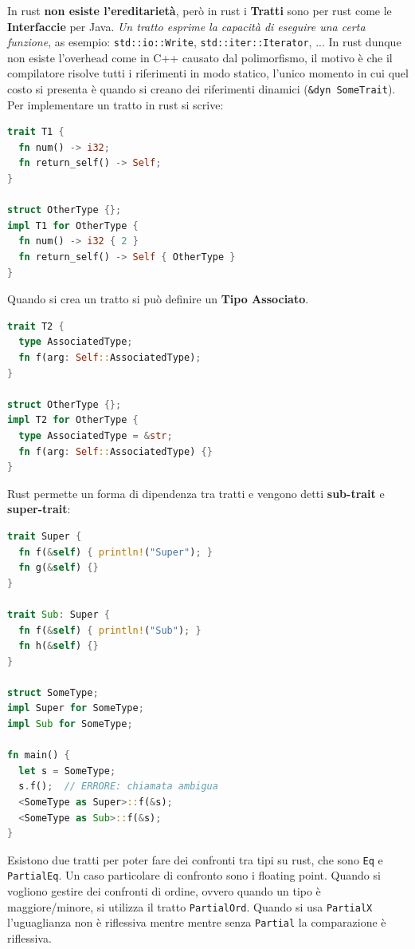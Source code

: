 \documentclass[12pt]{article}
\begin{document}
\hfill

In rust \textbf{non esiste l'ereditariet\`a}, per\`o in rust i \textbf{Tratti} sono per rust come le \textbf{Interfaccie} per Java. \emph{Un tratto esprime la capacit\`a di eseguire una certa funzione}, as esempio: \texttt{std::io::Write}, \texttt{std::iter::Iterator}, ... In rust dunque non esiste l'overhead come in C++ causato dal polimorfismo, il motivo \`e che il compilatore risolve tutti i riferimenti in modo statico, l'unico momento in cui quel costo si presenta \`e quando si creano dei riferimenti dinamici (\texttt{\&dyn SomeTrait}). Per implementare un tratto in rust si scrive:
\begin{lstlisting}[language=rust]
trait T1 {
  fn num() -> i32;
  fn return_self() -> Self;
}

struct OtherType {};
impl T1 for OtherType {
  fn num() -> i32 { 2 }
  fn return_self() -> Self { OtherType }
}
\end{lstlisting}
Quando si crea un tratto si pu\`o definire un \textbf{Tipo Associato}.
\begin{lstlisting}[language=rust]
trait T2 {
  type AssociatedType;
  fn f(arg: Self::AssociatedType);
}

struct OtherType {};
impl T2 for OtherType {
  type AssociatedType = &str;
  fn f(arg: Self::AssociatedType) {}
}
\end{lstlisting}
Rust permette un forma di dipendenza tra tratti e vengono detti \textbf{sub-trait} e \textbf{super-trait}:
\begin{lstlisting}[language=rust]
trait Super {
  fn f(&self) { println!("Super"); }
  fn g(&self) {}
}

trait Sub: Super {
  fn f(&self) { println!("Sub"); }
  fn h(&self) {} 
}

struct SomeType;
impl Super for SomeType;
impl Sub for SomeType;

fn main() {
  let s = SomeType;
  s.f();  // ERRORE: chiamata ambigua
  <SomeType as Super>::f(&s);
  <SomeType as Sub>::f(&s);
}
\end{lstlisting}

Esistono due tratti per poter fare dei confronti tra tipi su rust, che sono \texttt{Eq} e \texttt{PartialEq}. Un caso particolare di confronto sono i floating point. Quando si vogliono gestire dei confronti di ordine, ovvero quando un tipo \`e maggiore/minore, si utilizza il tratto \texttt{PartialOrd}. Quando si usa \texttt{PartialX} l'uguaglianza non \`e riflessiva mentre mentre senza \texttt{Partial} la comparazione \`e riflessiva.
\end{document}
